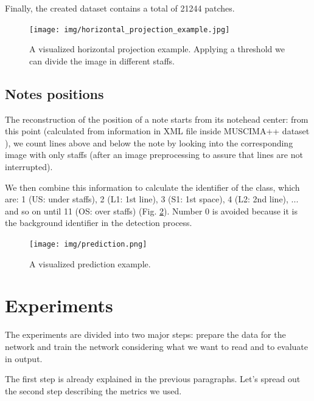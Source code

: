 \documentclass[journal]{IEEEtran}
\begin{document}
	Finally, the created dataset contains a total of 21244 patches.
	
	\begin{figure} [H]
		\begin{center}
			\texttt{[image: img/horizontal\_projection\_example.jpg]}\\
			\caption{A visualized horizontal projection example. Applying a threshold we can divide the image in different staffs.}
			\label{fig:horizontal_projection_example}
		\end{center}
	\end{figure}
	
	\subsection{Notes positions}
	The reconstruction of the position of a note starts from its notehead center: from this point (calculated from information in XML file inside MUSCIMA++ dataset \cite{MUSCIMA++-ARTICLE}), we count lines above and below the note by looking into the corresponding image with only staffs (after an image preprocessing to assure that lines are not interrupted). 
	
	We then combine this information to calculate the identifier of the class, which are: 1 (US: under staffs), 2 (L1: 1st line), 3 (S1: 1st space), 4 (L2: 2nd line), ... and so on until 11 (OS: over staffs) (Fig. \ref{fig:prediction}). Number 0 is avoided because it is the background identifier in the detection process.
	
	\begin{figure} [H]
		\begin{center}
			\texttt{[image: img/prediction.png]}\\
			\caption{A visualized prediction example.}
			\label{fig:prediction}
		\end{center}
	\end{figure}
		
	\section{Experiments}
	The experiments are divided into two major steps: prepare the data for the network and train the network considering what we want to read and to evaluate in output.
	
	The first step is already explained in the previous paragraphs. Let's spread out the second step describing the metrics we used.
	
\end{document}
